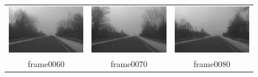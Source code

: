 \documentclass[12pt]{report}
\begin{document}
\begin{figure}[H]
\begin{tabular}{ccc}
	\includegraphics[scale=\videoScale]{images/frame0060.jpg} & \includegraphics[scale=\videoScale]{images/frame0070.jpg} & \includegraphics[scale=\videoScale]{images/frame0080.jpg}\\
	frame0060 & frame0070 & frame0080 \\

\end{tabular}
\end{figure}
\end{document}

